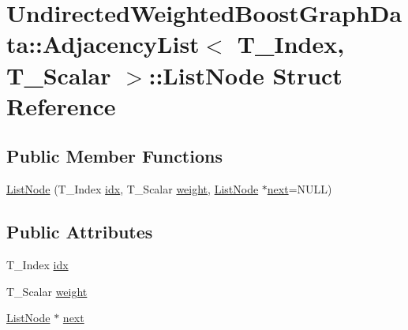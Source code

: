 \hypertarget{struct_undirected_weighted_graph_1_1_adjacency_list_1_1_list_node}{\section{Undirected\+Weighted\+BoostGraphData\+:\+:Adjacency\+List$<$ T\+\_\+\+Index, T\+\_\+\+Scalar $>$\+:\+:List\+Node Struct Reference}
\label{struct_undirected_weighted_graph_1_1_adjacency_list_1_1_list_node}
}
\subsection*{Public Member Functions}
\begin{DoxyCompactItemize}
\item 
\hyperlink{struct_undirected_weighted_graph_1_1_adjacency_list_1_1_list_node_a454cc91adb3073dc3f4bdccf1d04f549}{List\+Node} (T\+\_\+\+Index \hyperlink{struct_undirected_weighted_graph_1_1_adjacency_list_1_1_list_node_ae35b343eda23b364db9d9239d9f0ce24}{idx}, T\+\_\+\+Scalar \hyperlink{struct_undirected_weighted_graph_1_1_adjacency_list_1_1_list_node_ad7d0aedb78ca2bf0ae2e9c55a8a32596}{weight}, \hyperlink{struct_undirected_weighted_graph_1_1_adjacency_list_1_1_list_node}{List\+Node} $\ast$\hyperlink{struct_undirected_weighted_graph_1_1_adjacency_list_1_1_list_node_a6f0bbab55afd9ce7a56a14d83816f141}{next}=N\+U\+L\+L)
\end{DoxyCompactItemize}
\subsection*{Public Attributes}
\begin{DoxyCompactItemize}
\item 
T\+\_\+\+Index \hyperlink{struct_undirected_weighted_graph_1_1_adjacency_list_1_1_list_node_ae35b343eda23b364db9d9239d9f0ce24}{idx}
\item 
T\+\_\+\+Scalar \hyperlink{struct_undirected_weighted_graph_1_1_adjacency_list_1_1_list_node_ad7d0aedb78ca2bf0ae2e9c55a8a32596}{weight}
\item 
\hyperlink{struct_undirected_weighted_graph_1_1_adjacency_list_1_1_list_node}{List\+Node} $\ast$ \hyperlink{struct_undirected_weighted_graph_1_1_adjacency_list_1_1_list_node_a6f0bbab55afd9ce7a56a14d83816f141}{next}
\end{DoxyCompactItemize}


